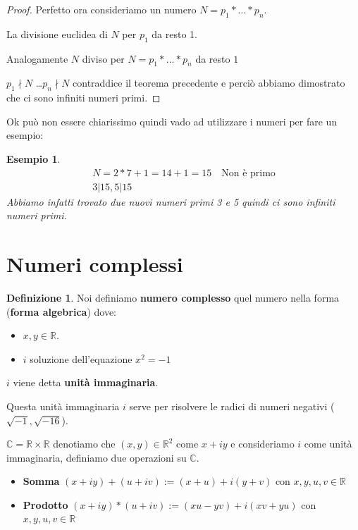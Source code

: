 \documentclass{article}
\newtheorem{exmp}{Esempio}[section]
\theoremstyle{definition}
\newtheorem{definition}{Definizione}[section]
\begin{document}
\begin{tcolorbox}
\begin{proof}
Perfetto ora consideriamo un numero $N = p_1* \ldots * p_n$. \par
La divisione euclidea di $N$ per $p_1$ da resto 1. \par
Analogamente $N$ diviso per $N = p_1* \ldots * p_n$ da resto $1$ \par
$p_1 \nmid N$ \ldots  $p_n \nmid N$ contraddice il teorema precedente e perciò abbiamo dimostrato che ci sono infiniti numeri primi.
\end{proof}
\end{tcolorbox}


Ok può non essere chiarissimo quindi vado ad utilizzare i numeri per fare un esempio:
\begin{exmp}
        \begin{align*}
                N = 2 * 7 + 1 = 14 + 1 = 15 \quad \textrm{Non è primo} \\
                3 | 15, 5 | 15
        \end{align*}
Abbiamo infatti trovato due nuovi numeri primi 3 e 5 quindi ci sono infiniti numeri primi.
\end{exmp}






\newpage
\section{Numeri complessi}\label{sec:numeri_complessi}
\begin{definition}
        Noi definiamo \textbf{numero complesso} quel numero nella forma  (\textbf{forma algebrica}) dove:
        \begin{itemize}
                \item $ x,y \in \mathbb{R} $.
                \item $ i $ soluzione dell'equazione $ x^2 = -1 $  
        \end{itemize} 
        $ i $  viene detta \textbf{unità immaginaria}. \par
        Questa unità immaginaria $ i $ serve per risolvere le radici di numeri negativi ($ \sqrt{-1}, \sqrt{-16} $). 
\end{definition}

$\mathbb{C} = \mathbb{R} \times \mathbb{R}$ denotiamo che $(x,y) \in \mathbb{R}^2$ come $x + iy$ e consideriamo $i$ come unità immaginaria, definiamo due operazioni su $ \mathbb{C} $.
\begin{itemize}
        \item \textbf{Somma} $(x + iy) + (u + iv) := (x+u) + i(y+v)$ con $x,y,u,v \in \mathbb{R}$
        \item \textbf{Prodotto} $(x + iy) * (u + iv) := (xu - yv) + i(xv+yu)$ con $x,y,u,v \in \mathbb{R}$
\end{itemize}
\end{document}
